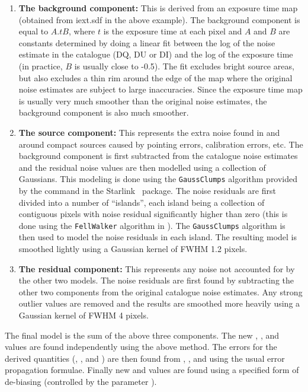 \begin{enumerate}
\item {\bf The background component:} This is derived from an exposure time map  (obtained from
iext.sdf in the above example). The background component is equal to $A.tB$, where $t$ is 
the exposure time at each pixel and $A$ and $B$ are constants determined by doing a linear fit 
between
the log of the noise estimate in the catalogue (DQ, DU or DI) and the log of the exposure time
(in practice, $B$ is usually close to -0.5). The fit excludes bright source areas, but also excludes a
thin rim around the edge of the map where the original noise estimates are subject to large
inaccuracies. Since the exposure time map is usually very much smoother than the original
noise estimates, the background component is also much smoother.
\item {\bf The source component:} This represents the extra noise found in and around compact sources caused by pointing errors, calibration errors, etc. The background component is first subtracted from the catalogue noise estimates and the residual noise values are then modelled using a collection of Gaussians. This modeling is done using the \texttt{GaussClumps} algorithm provided by the  command in the Starlink \cupid\ package. The noise residuals are first divided into a number of ``islands'', each island being a collection of contiguous pixels with  noise residual significantly higher than zero (this is done using the \texttt{FellWalker} algorithm in \cupid). The \texttt{GaussClumps} algorithm is then used to model the noise residuals in each island. The resulting model is smoothed lightly using a Gaussian kernel of FWHM 1.2 pixels.
\item {\bf The residual component:} This represents any noise not accounted for by the other two models. The noise residuals are first found by subtracting the other two components from the original catalogue noise estimates. Any strong outlier values are removed and the results are smoothed more heavily using a Gaussian kernel of FWHM 4 pixels.
\end{enumerate}

The final model is the sum of the above three components. The new , , and  values are found independently using the above method. The errors for the derived quantities (, , and ) are then found from , , and  using the usual error propagation formulae. Finally new  and  values are found using a specified form of de-biasing (controlled by the parameter ).


